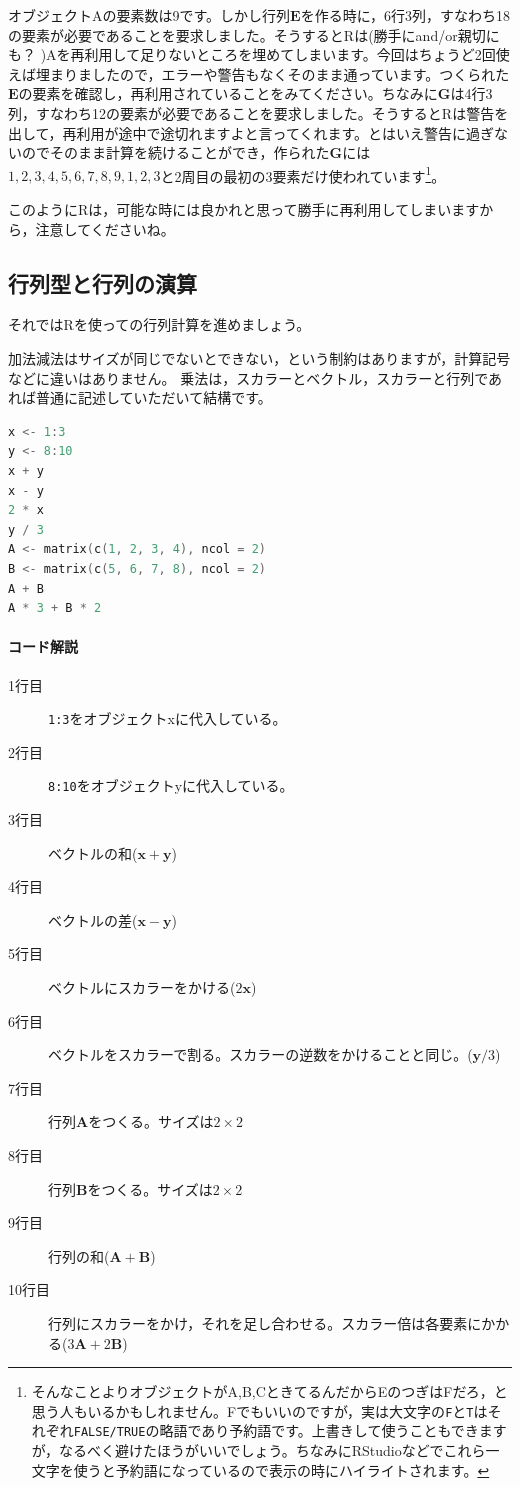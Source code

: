 \documentclass{ltjsbook}
\begin{document}
オブジェクトAの要素数は9です。しかし行列$\bm{E}$を作る時に，6行3列，すなわち18の要素が必要であることを要求しました。そうするとRは(勝手にand/or親切にも？ )Aを再利用して足りないところを埋めてしまいます。今回はちょうど2回使えば埋まりましたので，エラーや警告もなくそのまま通っています。つくられた$\bm{E}$の要素を確認し，再利用されていることをみてください。ちなみに$\bm{G}$は4行3列，すなわち12の要素が必要であることを要求しました。そうするとRは警告を出して，再利用が途中で途切れますよと言ってくれます。とはいえ警告に過ぎないのでそのまま計算を続けることができ，作られた$\bm{G}$には$1,2,3,4,5,6,7,8,9,1,2,3$と2周目の最初の3要素だけ使われています\footnote{そんなことよりオブジェクトがA,B,CときてるんだからEのつぎはFだろ，と思う人もいるかもしれません。Fでもいいのですが，実は大文字の\texttt{F}と\texttt{T}はそれぞれ\texttt{FALSE/TRUE}の略語であり予約語です。上書きして使うこともできますが，なるべく避けたほうがいいでしょう。ちなみにRStudioなどでこれら一文字を使うと予約語になっているので表示の時にハイライトされます。}。

このようにRは，可能な時には良かれと思って勝手に再利用してしまいますから，注意してくださいね。
\subsection{行列型と行列の演算}
それではRを使っての行列計算を進めましょう。

加法減法はサイズが同じでないとできない，という制約はありますが，計算記号などに違いはありません。
乗法は，スカラーとベクトル，スカラーと行列であれば普通に記述していただいて結構です。

\begin{lstlisting}[language=c++,label={code:09_03},caption={ベクトルの和・差，スカラーをかける}]
x <- 1:3
y <- 8:10
x + y
x - y
2 * x
y / 3
A <- matrix(c(1, 2, 3, 4), ncol = 2)
B <- matrix(c(5, 6, 7, 8), ncol = 2)
A + B
A * 3 + B * 2
\end{lstlisting}
\paragraph{コード解説}
\begin{description}
	\item[1行目] \texttt{1:3}をオブジェクトxに代入している。
	\item[2行目] \texttt{8:10}をオブジェクトyに代入している。
	\item[3行目] ベクトルの和($\bm{x}+\bm{y}$)
	\item[4行目] ベクトルの差($\bm{x}-\bm{y}$)
	\item[5行目] ベクトルにスカラーをかける($2\bm{x}$)
	\item[6行目] ベクトルをスカラーで割る。スカラーの逆数をかけることと同じ。($\bm{y}/3$)
	\item[7行目] 行列$\bm{A}$をつくる。サイズは$2 \times 2$
	\item[8行目] 行列$\bm{B}$をつくる。サイズは$2 \times 2$
	\item[9行目] 行列の和($\bm{A}+\bm{B}$)
	\item[10行目] 行列にスカラーをかけ，それを足し合わせる。スカラー倍は各要素にかかる($3\bm{A}+2\bm{B}$)
\end{description}
\end{document}
